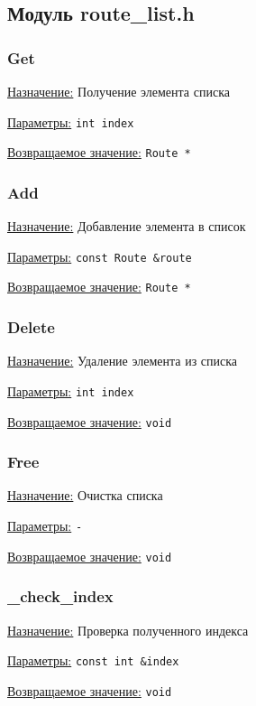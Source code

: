\subsection{Модуль route\_list.h}


\subsubsection{Get}

\underline{Назначение:} Получение элемента списка

\underline{Параметры:} \verb|int index|

\underline{Возвращаемое значение:} \verb|Route *|


\subsubsection{Add}

\underline{Назначение:} Добавление элемента в список

\underline{Параметры:} \verb|const Route &route|

\underline{Возвращаемое значение:} \verb|Route *|


\subsubsection{Delete}

\underline{Назначение:} Удаление элемента из списка

\underline{Параметры:} \verb|int index|

\underline{Возвращаемое значение:} \verb|void|


\subsubsection{Free}

\underline{Назначение:} Очистка списка

\underline{Параметры:} \verb|-|

\underline{Возвращаемое значение:} \verb|void|


\subsubsection{\_check\_index}

\underline{Назначение:} Проверка полученного индекса

\underline{Параметры:} \verb|const int &index|

\underline{Возвращаемое значение:} \verb|void|

